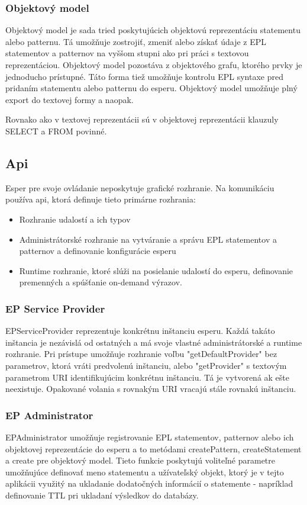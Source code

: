 		\subsubsection{Objektový model}	
		Objektový model je sada tried poskytujúcich objektovú reprezentáciu statementu alebo patternu. Tá umožňuje zostrojiť, zmeniť alebo získať údaje z EPL statementov a patternov na vyššom stupni ako pri práci s textovou reprezentáciou. Objektový model pozostáva z objektového grafu, ktorého prvky je jednoducho prístupné. Táto forma tiež umožňuje kontrolu EPL syntaxe pred pridaním statementu alebo patternu do esperu. Objektový model umožňuje plný export do textovej formy a naopak.
		
		Rovnako ako v textovej reprezentácii sú v objektovej reprezentácii klauzuly SELECT a FROM povinné.
		
	\subsection{Api}
		Esper pre svoje ovládanie neposkytuje grafické rozhranie. Na komunikáciu používa api, ktorá definuje tieto primárne rozhrania:
		\begin{itemize}
			\item Rozhranie udalostí a ich typov
			\item Administrátorské rozhranie na vytváranie a správu EPL statementov a patternov a definovanie konfigurácie esperu
			\item Runtime rozhranie, ktoré slúži na posielanie udalostí do esperu, definovanie premenných a spúšťanie on-demand výrazov.
		\end{itemize}
		
		\subsubsection{EP Service Provider}
		EPServiceProvider reprezentuje konkrétnu inštanciu esperu. Každá takáto inštancia je nezávislá od ostatných a má svoje vlastné administrátorské a runtime rozhranie. Pri prístupe umožňuje rozhranie voľbu "getDefaultProvider" bez parametrov, ktorá vráti predvolenú inštanciu, alebo "getProvider" s textovým parametrom URI identifikujúcim konkrétnu inštanciu. Tá je vytvorená ak ešte neexistuje. Opakované volania s rovnakým URI vracajú stále rovnakú inštanciu.
		
		\subsubsection{EP Administrator}
		EPAdministrator umožňuje registrovanie EPL statementov, patternov alebo ich objektovej reprezentácie do esperu a to metódami createPattern, createStatement a create pre objektový model. Tieto funkcie poskytujú voliteľné parametre umožňujúce definovať meno statementu a užívateľský objekt, ktorý je v tejto aplikácii využitý na ukladanie dodatočných informácií o statemente - napríklad definovanie TTL pri ukladaní výsledkov do databázy.
		
